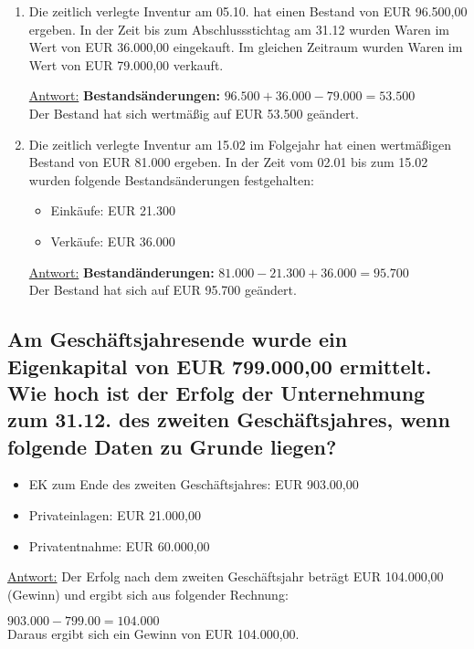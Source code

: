 \documentclass[a4paper,11pt]{scrartcl}	%
\begin{document}
		\begin{enumerate}
			\item Die zeitlich verlegte Inventur am 05.10. hat einen Bestand von EUR 96.500,00 ergeben. In der Zeit
				bis zum Abschlussstichtag am 31.12 wurden Waren im Wert von EUR 36.000,00 eingekauft.
				Im gleichen Zeitraum wurden Waren im Wert von EUR 79.000,00 verkauft.\par
				\underline{Antwort:} \textbf{Bestandsänderungen:} $96.500 + 36.000 - 79.000 = 53.500$\\
				Der Bestand hat sich wertmäßig auf EUR 53.500 geändert.
			\item Die zeitlich verlegte Inventur am 15.02 im Folgejahr hat einen wertmäßigen Bestand von EUR 81.000
				ergeben. In der Zeit vom 02.01 bis zum 15.02 wurden folgende Bestandsänderungen festgehalten:
					\begin{itemize}
						\item Einkäufe: EUR 21.300
						\item Verkäufe: EUR 36.000
					\end{itemize}
				\underline{Antwort:} \textbf{Bestandänderungen:} $81.000 - 21.300 + 36.000 = 95.700$\\
				Der Bestand hat sich auf EUR 95.700 geändert.
		\end{enumerate}
	
	\subsection{Am Geschäftsjahresende wurde ein Eigenkapital von EUR 799.000,00 ermittelt.	Wie hoch ist der Erfolg der
	Unternehmung zum 31.12. des zweiten Geschäftsjahres, wenn folgende Daten zu Grunde liegen?}

		\begin{itemize}
			\item EK zum Ende des zweiten Geschäftsjahres: EUR 903.00,00
			\item Privateinlagen: EUR 21.000,00
			\item Privatentnahme: EUR 60.000,00
		\end{itemize}

	\underline{Antwort:} Der Erfolg nach dem zweiten Geschäftsjahr beträgt EUR 104.000,00 (Gewinn) und ergibt sich aus
	folgender Rechnung:\par
	$903.000 - 799.00 = 104.000$\\
	Daraus ergibt sich ein Gewinn von EUR 104.000,00.
\end{document}
